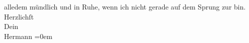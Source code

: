 \begin{ledgroupsized}[t]{13cm}
               alledem mündlich und \introOben{}in\introOben{} Ruhe, wenn ich nicht gerade auf dem
               Sprung zur \label{K_L01172_2v}\label{K_L01172_2h} bin.\pend
           \pstart
           Herzlichſt{\\[\baselineskip]}Dein{\\[\baselineskip]}\spacefill\mbox{Hermann}\pend
           \leftskip=0em{}
         
         \endnumbering{}\end{ledgroupsized}  \newcommand{\dateiname}{L01172}\newcommand{\titel}{Hermann Bahr an Arthur Schnitzler, 12. 9. 1901}\newcommand{\editorInnen}{ Kurt Ifkovits,  Martin Anton Müller}
      